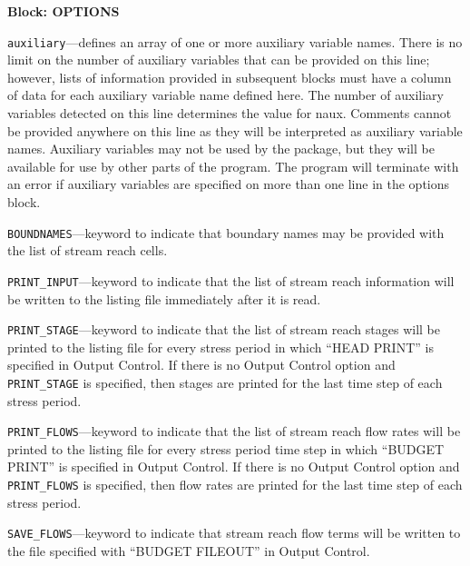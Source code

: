
\item \textbf{Block: OPTIONS}

\begin{description}
\item \texttt{auxiliary}---defines an array of one or more auxiliary variable names.  There is no limit on the number of auxiliary variables that can be provided on this line; however, lists of information provided in subsequent blocks must have a column of data for each auxiliary variable name defined here.   The number of auxiliary variables detected on this line determines the value for naux.  Comments cannot be provided anywhere on this line as they will be interpreted as auxiliary variable names.  Auxiliary variables may not be used by the package, but they will be available for use by other parts of the program.  The program will terminate with an error if auxiliary variables are specified on more than one line in the options block.

\item \texttt{BOUNDNAMES}---keyword to indicate that boundary names may be provided with the list of stream reach cells.

\item \texttt{PRINT\_INPUT}---keyword to indicate that the list of stream reach information will be written to the listing file immediately after it is read.

\item \texttt{PRINT\_STAGE}---keyword to indicate that the list of stream reach stages will be printed to the listing file for every stress period in which ``HEAD PRINT'' is specified in Output Control.  If there is no Output Control option and \texttt{PRINT\_STAGE} is specified, then stages are printed for the last time step of each stress period.

\item \texttt{PRINT\_FLOWS}---keyword to indicate that the list of stream reach flow rates will be printed to the listing file for every stress period time step in which ``BUDGET PRINT'' is specified in Output Control.  If there is no Output Control option and \texttt{PRINT\_FLOWS} is specified, then flow rates are printed for the last time step of each stress period.

\item \texttt{SAVE\_FLOWS}---keyword to indicate that stream reach flow terms will be written to the file specified with ``BUDGET FILEOUT'' in Output Control.


\end{description}
